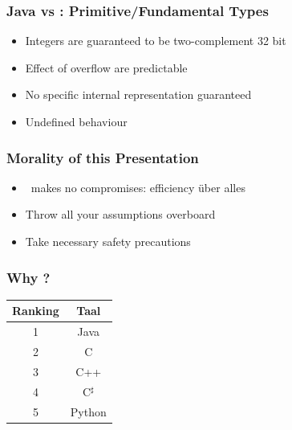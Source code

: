 \begin{frame}
  \frametitle{Java vs \cpp: Primitive/Fundamental Types}
  \begin{itemize}
    \item Integers are guaranteed to be two-complement 32 bit
    \item Effect of overflow are predictable
  \end{itemize}
  \vskip2mm
  \structure{\cpp}
  \begin{itemize}
    \item No specific internal representation guaranteed 
    \item Undefined behaviour
  \end{itemize}
\end{frame}

\begin{frame}
  \frametitle{Morality of this Presentation}
  \begin{itemize}
    \item \cpp\ makes no compromises: efficiency \"uber alles
    \item Throw all your assumptions overboard
    \item Take necessary safety precautions
  \end{itemize}
\end{frame}

\begin{frame}
  \frametitle{Why \cpp?}
  \begin{center}
    \begin{tabular}{cc}
      \textbf{Ranking} & \textbf{Taal} \\
      \toprule
      1 & Java \\
      2 & C \\
      3 & C++ \\
      4 & C$^\sharp$ \\
      5 & Python \\
    \end{tabular}
    \vskip5mm
  \end{center}
\end{frame}

